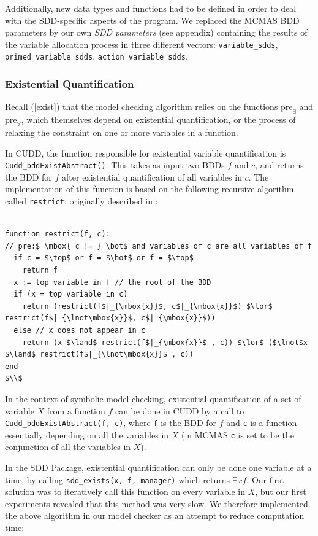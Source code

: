 \documentclass[11pt]{article}
\begin{document}
Additionally, new data types and functions had to be defined in order to deal with the SDD-specific aspects of the program. We replaced the MCMAS BDD parameters by our own \textit{SDD parameters} (see appendix) containing the results of the variable allocation process in three different vectors: \texttt{variable\_sdds}, \texttt{primed\_variable\_sdds}, \texttt{action\_variable\_sdds}.

\subsubsection{Existential Quantification}

Recall  (\ref{exist}) that the model checking algorithm relies on the functions $\mbox{pre}_\exists$ and $\mbox{pre}_\forall$, which themselves depend on existential quantification, or the process of relaxing the constraint on one or more variables in a function. 

In CUDD, the function responsible for existential variable quantification is \texttt{Cudd\_bddExistAbstract()}. This takes as input two BDDs $f$ and $c$, and returns the BDD for $f$ after existential quantification of all variables in $c$. The implementation of this function is based on the following recursive algorithm called \texttt{restrict}, originally described in \cite{unified_framework}: 

\begin{lstlisting}[mathescape]

function restrict(f, c):
// pre:$ \mbox{ c != } \bot$ and variables of c are all variables of f
  if c = $\top$ or f = $\bot$ or f = $\top$
    return f
  x := top variable in f // the root of the BDD
  if (x = top variable in c)  
    return (restrict(f$|_{\mbox{x}}$, c$|_{\mbox{x}}$) $\lor$ restrict(f$|_{\lnot\mbox{x}}$, c$|_{\mbox{x}}$))
  else // x does not appear in c
    return (x $\land$ restrict(f$|_{\mbox{x}}$ , c)) $\lor$ ($\lnot$x $\land$ restrict(f$|_{\lnot\mbox{x}}$ , c))
end
$\\$
\end{lstlisting}

In the context of symbolic model checking, existential quantification of a set of variable $X$ from a function $f$ can be done in CUDD by a call to \texttt{Cudd\_bddExistAbstract(f, c)}, where \texttt{f} is the BDD for $f$ and \texttt{c} is a function essentially depending on all the variables in $X$ (in MCMAS \texttt{c} is set to be the conjunction of all the variables in $X$).

In the SDD Package, existential quantification can only be done one variable at a time, by calling \texttt{sdd\_exists(x, f, manager)} which returns $\exists x f$. Our first solution was to iteratively call this function on every variable in $X$, but our first experiments revealed that this method was very slow. We therefore implemented the above algorithm in our model checker as an attempt to reduce computation time:
\end{document}
